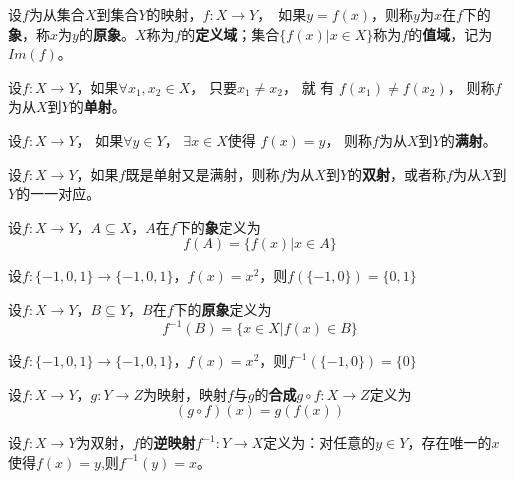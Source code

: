 \documentclass{beamer}
\begin{document}
\begin{CJK*}{UTF8}{gbsn}
\begin{frame}
\end{frame}
\begin{frame}
    \begin{Def}
    设$f$为从集合$X$到集合$Y$的映射，$f:X\to Y$，　如果$y = f(x)$，则称$y$为$x$在$f$下的{\bfseries 象}，称$x$为$y$的{\bfseries 原象}。$X$称为$f$的{\bfseries 定义域}；集合$\{f(x) | x \in X\}$称为$f$的{\bfseries 值域}，记为$Im(f)$。
  \end{Def}
\end{frame}
\begin{frame}
    \begin{Def}
    设$f:X\to Y$，如果$\forall x_1, x_2 \in X$， 只要$x_1 \neq x_2$，  就 有 $f(x_1) \neq f(x_2)$，   则称$f$为从$X$到$Y$的{\bfseries 单射}。
  \end{Def}
  \begin{Def}
    设$f:X\to Y$， 如果$\forall y \in Y$， $\exists x \in X$使得 $f(x) = y$， 则称$f$为从$X$到$Y$的{\bfseries 满射}。
  \end{Def}
  \begin{Def}
    设$f:X\to Y$，如果$f$既是单射又是满射，则称$f$为从$X$到$Y$的{\bfseries 双射}，或者称$f$为从$X$到$Y$的一一对应。
  \end{Def}
\end{frame}
\begin{frame}
    \begin{Def}
    设$f:X\to Y$，$A \subseteq X$，$A$在$f$下的{\bfseries 象}定义为\[f(A)=\{f(x)|x\in A\}\]
  \end{Def}
  \begin{Ex}
    设$f:\{-1,0,1\}\to \{-1,0,1\}$，$f(x)=x^2$，则$f(\{-1,0\})=\{0,1\}$
  \end{Ex}
\end{frame}
\begin{frame}
    \begin{Def}
    设$f:X\to Y$，$B \subseteq Y$，$B$在$f$下的{\bfseries 原象}定义为\[f^{-1}(B)=\{x\in X|f(x)\in B\}\]
  \end{Def}
  \begin{Ex}
    设$f:\{-1,0,1\}\to \{-1,0,1\}$，$f(x)=x^2$，则$f^{-1}(\{-1,0\})=\{0\}$
  \end{Ex}
\end{frame}
\begin{frame}
   \begin{Def}
    设$f:X\to Y$，$g:Y\to Z$为映射，映射$f$与$g$的{\bfseries 合成}$g\circ f:X\to Z$定义为\[(g\circ f)(x) = g(f(x))\]
  \end{Def}
\end{frame}
\begin{frame}
   \begin{Def}
     设$f:X\to Y$为双射，$f$的{\bfseries 逆映射}$f^{-1}:Y\to X$定义为：对任意的$y\in Y$，存在唯一的$x$使得$f(x)=y$,则$f^{-1}(y)=x$。
   \end{Def}


\end{frame}
\end{CJK*}
\end{document}
